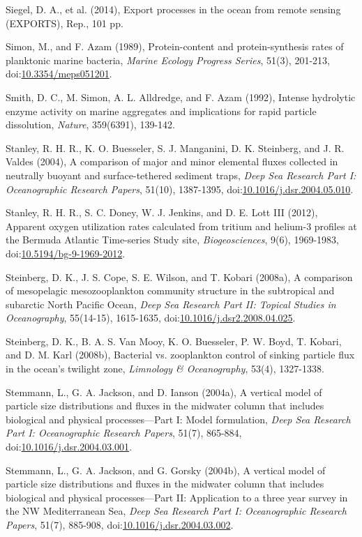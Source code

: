 \begin{singlespace}
{{Siegel, D. A., et al. (2014), Export processes in the ocean from remote sensing (EXPORTS), Rep., 101 pp.

Simon, M., and F. Azam (1989), Protein-content and protein-synthesis rates of planktonic marine bacteria, \emph{Marine Ecology Progress Series}, 51(3), 201-213, doi:\href{http://dx.doi.org/10.3354/meps051201}{10.3354/meps051201}.

Smith, D. C., M. Simon, A. L. Alldredge, and F. Azam (1992), Intense hydrolytic enzyme activity on marine aggregates and implications for rapid particle dissolution, \emph{Nature}, 359(6391), 139-142.

Stanley, R. H. R., K. O. Buesseler, S. J. Manganini, D. K. Steinberg, and J. R. Valdes (2004), A comparison of major and minor elemental fluxes collected in neutrally buoyant and surface-tethered sediment traps, \emph{Deep Sea Research Part I: Oceanographic Research Papers}, 51(10), 1387-1395, doi:\href{http://dx.doi.org/10.1016/j.dsr.2004.05.010}{10.1016/j.dsr.2004.05.010}.

Stanley, R. H. R., S. C. Doney, W. J. Jenkins, and D. E. Lott III (2012), Apparent oxygen utilization rates calculated from tritium and helium-3 profiles at the Bermuda Atlantic Time-series Study site, \emph{Biogeosciences}, 9(6), 1969-1983, doi:\href{http://dx.doi.org/10.5194/bg-9-1969-2012}{10.5194/bg-9-1969-2012}.

Steinberg, D. K., J. S. Cope, S. E. Wilson, and T. Kobari (2008a), A comparison of mesopelagic mesozooplankton community structure in the subtropical and subarctic North Pacific Ocean, \emph{Deep Sea Research Part II: Topical Studies in Oceanography}, 55(14-15), 1615-1635, doi:\href{http://dx.doi.org/10.1016/j.dsr2.2008.04.025}{10.1016/j.dsr2.2008.04.025}.

Steinberg, D. K., B. A. S. Van Mooy, K. O. Buesseler, P. W. Boyd, T. Kobari, and D. M. Karl (2008b), Bacterial vs. zooplankton control of sinking particle flux in the ocean's twilight zone, \emph{Limnology \& Oceanography}, 53(4), 1327-1338.

Stemmann, L., G. A. Jackson, and D. Ianson (2004a), A vertical model of particle size distributions and fluxes in the midwater column that includes biological and physical processes---Part I: Model formulation, \emph{Deep Sea Research Part I: Oceanographic Research Papers}, 51(7), 865-884, doi:\href{http://dx.doi.org/10.1016/j.dsr.2004.03.001}{10.1016/j.dsr.2004.03.001}.

Stemmann, L., G. A. Jackson, and G. Gorsky (2004b), A vertical model of particle size distributions and fluxes in the midwater column that includes biological and physical processes---Part II: Application to a three year survey in the NW Mediterranean Sea, \emph{Deep Sea Research Part I: Oceanographic Research Papers}, 51(7), 885-908, doi:\href{http://dx.doi.org/10.1016/j.dsr.2004.03.002}{10.1016/j.dsr.2004.03.002}.

}}
\end{singlespace}
